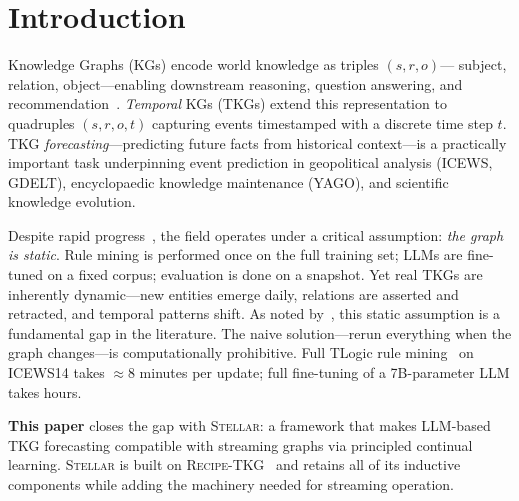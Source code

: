 \documentclass[10pt,twocolumn]{article}
\theoremstyle{definition}
\newcommand{\recipe}{\textsc{Recipe-TKG}}
\begin{document}
\section{Introduction}
\label{sec:intro}

Knowledge Graphs (KGs) encode world knowledge as triples $(s, r, o)$---
subject, relation, object---enabling downstream reasoning, question answering,
and recommendation~\citep{Hogan2021kg}.
\emph{Temporal} KGs (TKGs) extend this representation to quadruples
$(s, r, o, t)$ capturing events timestamped with a discrete time step $t$.
TKG \emph{forecasting}---predicting future facts from historical
context---is a practically important task underpinning event prediction in
geopolitical analysis (ICEWS, GDELT), encyclopaedic knowledge maintenance
(YAGO), and scientific knowledge evolution.

Despite rapid progress~\citep{Li2021regcn,Sun2021timetraveler,
Liao2024gentkg,Akgul2025recipe}, the field operates under a critical
assumption: \emph{the graph is static}.
Rule mining is performed once on the full training set; LLMs are fine-tuned
on a fixed corpus; evaluation is done on a snapshot.
Yet real TKGs are inherently dynamic---new entities emerge daily, relations
are asserted and retracted, and temporal patterns shift.
As noted by~\citet{MacDube2023review}, this static assumption is a
fundamental gap in the literature.
The naive solution---rerun everything when the graph changes---is
computationally prohibitive.
Full TLogic rule mining~\citep{Liu2022tlogic} on ICEWS14 takes $\approx$8
minutes per update; full fine-tuning of a 7B-parameter LLM takes hours.

\medskip
\noindent\textbf{This paper} closes the gap with \textsc{Stellar}: a framework that
makes LLM-based TKG forecasting compatible with streaming graphs via
principled continual learning.
\textsc{Stellar} is built on \recipe{}~\citep{Akgul2025recipe} and retains all of
its inductive components while adding the machinery needed for
streaming operation.
\end{document}
